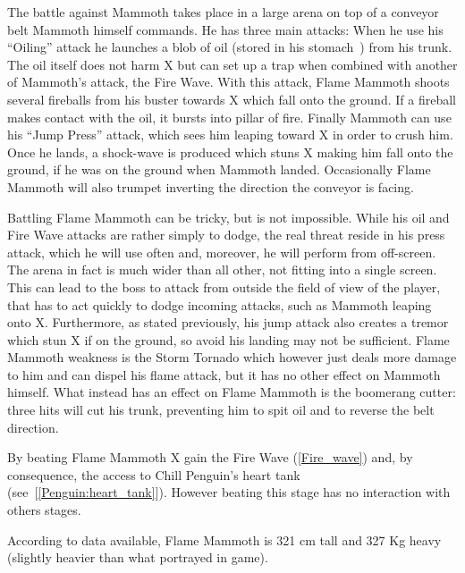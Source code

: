 The battle against Mammoth takes place in a large arena on top of a conveyor belt Mammoth himself commands. He has three main attacks: When he use his ``Oiling'' attack he launches a blob of oil (stored in his stomach~\cite{wayback:X_resources}) from his trunk. 
The oil itself does not harm X but can set up a trap when combined with another of Mammoth's attack, the Fire Wave. With this attack, Flame Mammoth shoots several fireballs from his buster towards X which fall onto the ground. If a fireball makes contact with the oil, it bursts into pillar of fire. Finally Mammoth can use his ``Jump Press'' attack, which sees him leaping toward X in order to crush him. Once he lands, a shock-wave is produced which stuns X making him fall onto the ground, if he was on the ground when Mammoth landed. Occasionally Flame Mammoth will also trumpet inverting the direction the conveyor is facing. 

Battling Flame Mammoth can be tricky, but is not impossible. While his oil and Fire Wave attacks are rather simply to dodge, the real threat reside in his press attack, which he will use often and, moreover, he will perform from off-screen. The arena in fact is much wider than all other, not fitting into a single screen. This can lead to the boss to attack from outside the field of view of the player, that has  to act quickly to dodge incoming attacks, such as Mammoth leaping onto X. Furthermore, as stated previously, his jump attack also creates a tremor which stun X if on the ground, so avoid his landing may not be sufficient. Flame Mammoth weakness is the Storm Tornado which however just deals more damage to him and can dispel his flame attack, but it has no other effect on Mammoth himself. What instead has an effect on Flame Mammoth is the boomerang cutter: three hits will cut his trunk, preventing him to spit oil and to reverse the belt direction.

By beating Flame Mammoth X gain the Fire Wave (\ref{Fire_wave}) and, by consequence, the access to Chill Penguin's heart tank (see~[\ref{Penguin:heart_tank}]). However beating this stage has no interaction with others stages.

According to data available, Flame Mammoth is 321 cm tall and 327 Kg heavy (slightly heavier than what portrayed in game).


